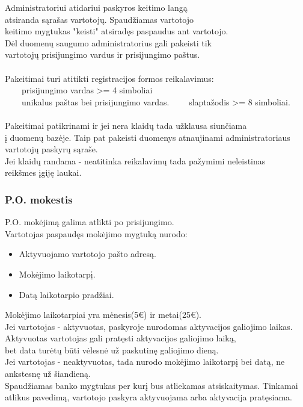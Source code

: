 \documentclass[a4paper,12pt]{article}
\newcommand{\tabitem}{~~\llap{\textbullet}~~}
\begin{document}
Administratoriui atidariui paskyros keitimo langą\\
atsiranda sąrašas vartotojų. Spaudžiamas vartotojo \\
keitimo mygtukas "keisti" atsiradęs paspaudus ant vartotojo.\\
Dėl duomenų saugumo administratorius gali pakeisti tik\\
vartotojų prisijungimo vardus ir prisijungimo paštus. \\\\

Pakeitimai turi atitikti registracijos formos reikalavimus: \\
	\tabitem prisijungimo vardas >= 4 simboliai\\
	\tabitem unikalus paštas bei prisijungimo vardas.
    \tabitem slaptažodis >= 8 simboliai. \\\\
    
Pakeitimai patikrinami ir jei nera klaidų tada užklausa siunčiama \\
į duomenų bazėje. Taip pat pakeisti duomenys atnaujinami administratoriaus \\
vartotojų paskyrų sąraše. \\
Jei klaidų randama - neatitinka reikalavimų tada pažymimi neleistinas \\
reikšmes įgiję laukai.\\

\subsubsection{P.O. mokestis}
P.O. mokėjimą galima atlikti po prisijungimo. \\
Vartotojas paspaudęs mokėjimo mygtuką nurodo:
\begin{itemize}
	\item Aktyvuojamo vartotojo pašto adresą.
	\item Mokėjimo laikotarpį.
	\item Datą laikotarpio pradžiai.
\end{itemize} 
Mokėjimo laikotarpiai yra mėnesis(5€) ir metai(25€). \\
Jei vartotojas - aktyvuotas, paskyroje nurodomas aktyvacijos galiojimo laikas.\\
Aktyvuotas vartotojas gali pratęsti aktyvacijos galiojimo laiką, \\
bet data turėtų būti vėlesnė už paskutinę galiojimo dieną.\\
Jei vartotojas - neaktyvuotas, tada nurodo mokėjimo laikotarpį bei datą,
ne ankstesnę už šiandieną. \\
Spaudžiamas banko mygtukas per kurį bus atliekamas atsiskaitymas.
Tinkamai atlikus pavedimą, vartotojo paskyra aktyvuojama arba aktyvacija pratęsiama.
\end{document}
